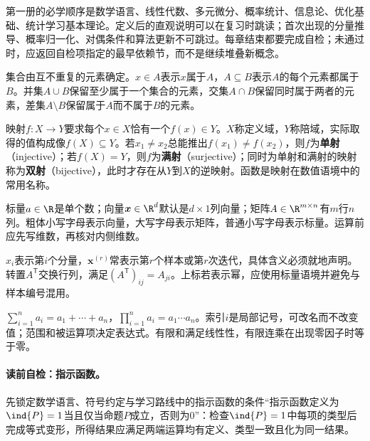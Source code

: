 第一册的必学顺序是数学语言、线性代数、多元微分、概率统计、信息论、优化基础、统计学习基本理论。定义后的直观说明可以在复习时跳读；首次出现的分量推导、概率归一化、对偶条件和算法更新不可跳过。每章结束都要完成自检；未通过时，应返回自检项指定的最早依赖节，而不是继续堆叠新概念。


集合由互不重复的元素确定。$x\in A$表示$x$属于$A$，$A\subseteq B$表示$A$的每个元素都属于$B$。并集$A\cup B$保留至少属于一个集合的元素，交集$A\cap B$保留同时属于两者的元素，差集$A\setminus B$保留属于$A$而不属于$B$的元素。

映射$f:X\to Y$要求每个$x\in X$恰有一个$f(x)\in Y$。$X$称定义域，$Y$称陪域，实际取得的值构成像$f(X)\subseteq Y$。若$x_1\ne x_2$总能推出$f(x_1)\ne f(x_2)$，则$f$为\textbf{单射}（injective）；若$f(X)=Y$，则$f$为\textbf{满射}（surjective）；同时为单射和满射的映射称为\textbf{双射}（bijective），此时才存在从$Y$到$X$的逆映射。函数是映射在数值语境中的常用名称。


标量$a\in\R$是单个数；向量$\boldsymbol{x}\in\R^d$默认是$d\times1$列向量；矩阵$A\in\R^{m\times n}$有$m$行$n$列。粗体小写字母表示向量，大写字母表示矩阵，普通小写字母表示标量。运算前应先写维数，再核对内侧维数。

$x_i$表示第$i$个分量，$\boldsymbol{x}^{(r)}$常表示第$r$个样本或第$r$次迭代，具体含义必须就地声明。转置$A^{\mathsf T}$交换行列，满足$(A^{\mathsf T})_{ij}=A_{ji}$。上标若表示幂，应使用标量语境并避免与样本编号混用。


$\sum_{i=1}^{n}a_i=a_1+\cdots+a_n$，$\prod_{i=1}^{n}a_i=a_1\cdots a_n$。索引$i$是局部记号，可改名而不改变值；范围和被运算项决定表达式。有限和满足线性性，有限连乘在出现零因子时等于零。

\paragraph{读前自检：指示函数。}先锁定数学语言、符号约定与学习路线中的指示函数的条件“指示函数定义为$\ind\{P\}=1$当且仅当命题$P$成立，否则为$0$”：检查$\ind\{P\}=1$中每项的类型后完成等式变形，所得结果应满足两端运算均有定义、类型一致且化为同一结果。\par

